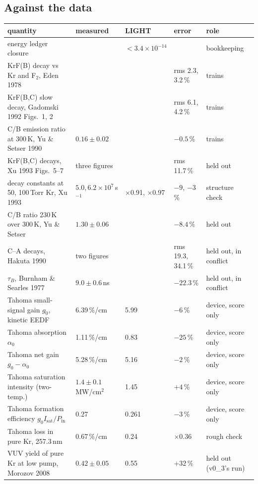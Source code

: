 \documentclass[11pt]{article}
\newcommand{\Ft}{F\ensuremath{_2}}
\newcommand{\x}{\ensuremath{\times}}
\begin{document}
\subsection{Against the data}

\begin{table}[H]
\small
\begin{tabularx}{\textwidth}{@{}Xllll@{}}
\toprule
quantity & measured & LIGHT & error & role \\
\midrule
energy ledger closure & & $<3.4\times10^{-14}$ & & bookkeeping \\
KrF(B) decay vs Kr and \Ft{}, Eden 1978 & & & rms 2.3, 3.2\,\% & trains \\
KrF(B,C) slow decay, Gadomski 1992 Figs.\ 1, 2 & & & rms 6.1, 4.2\,\% & trains \\
C/B emission ratio at 300\,K, Yu \& Setser 1990 & $0.16\pm0.02$ & & $-0.5$\,\% & trains \\
KrF(B,C) decays, Xu 1993 Figs.\ 5--7 & three figures & & rms 11.7\,\% & held out \\
decay constants at 50, 100\,Torr Kr, Xu 1993 & $5.0, 6.2\times10^7$\,s$^{-1}$ & \x0.91, \x0.97 & $-9$, $-3$\,\% & structure check \\
C/B ratio 230\,K over 300\,K, Yu \& Setser & $1.30\pm0.06$ & & $-8.4$\,\% & held out \\
C--A decays, Hakuta 1990 & two figures & & rms 19.3, 34.1\,\% & held out, in conflict \\
$\tau_B$, Burnham \& Searles 1977 & $9.0\pm0.6$\,ns & & $-22.3$\,\% & held out, in conflict \\
\midrule
Tahoma small-signal gain $g_0$, kinetic EEDF & 6.39\,\%/cm & 5.99 & $-6$\,\% & device, score only \\
Tahoma absorption $\alpha_0$ & 1.11\,\%/cm & 0.83 & $-25$\,\% & device, score only \\
Tahoma net gain $g_0-\alpha_0$ & 5.28\,\%/cm & 5.16 & $-2$\,\% & device, score only \\
Tahoma saturation intensity (two-temp.) & $1.4\pm0.1$\,MW/cm$^2$ & 1.45 & $+4$\,\% & device, score only \\
Tahoma formation efficiency $g_0I_\mathrm{sat}/P_\mathrm{in}$ & 0.27 & 0.261 & $-3$\,\% & device, score only \\
Tahoma loss in pure Kr, 257.3\,nm & 0.67\,\%/cm & 0.24 & \x0.36 & rough check \\
VUV yield of pure Kr at low pump, Morozov 2008 & $0.42\pm0.05$ & 0.55 & $+32$\,\% & held out (v0\_3's run) \\

\end{tabularx}
\end{table}
\end{document}
